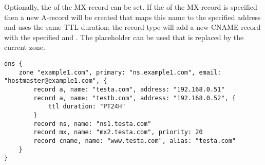 Optionally, the 
of the MX-record can be set. If the  of the MX-record is 
specified then a new A-record will be created that maps this name to the 
specified address and uses the same TTL duration;
the  record type will add
a new CNAME-record with the specified  and .
The placeholder \qcode{\%} can be used that is replaced by the current zone.

\begin{lstlisting}[style=Java]
dns {
    zone "example1.com", primary: "ns.example1.com", email: "hostmaster@example1.com", {
        record a, name: "testa.com", address: "192.168.0.51"
        record a, name: "testb.com", address: "192.168.0.52", { 
            ttl duration: "PT24H" 
        }
        record ns, name: "ns1.testa.com"
        record mx, name: "mx2.testa.com", priority: 20
        record cname, name: "www.testa.com", alias: "testa.com"
    }
}
\end{lstlisting}

